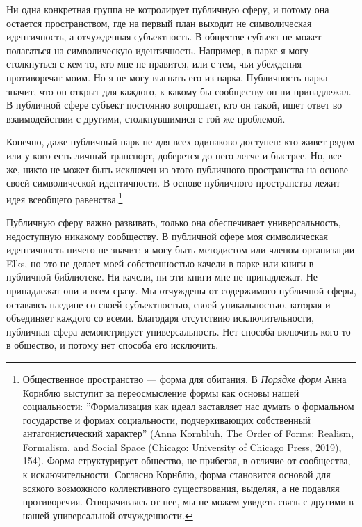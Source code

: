 \documentclass[12pt]{book}
\begin{document}
Ни одна конкретная группа не котролирует публичную сферу, и потому она остается пространством, где на первый план выходит не символическая идентичность, а отчужденная субъектность. В обществе субъект не может полагаться на символическую идентичность. Например, в парке я могу столкнуться с кем-то, кто мне не нравится, или с тем, чьи убеждения противоречат моим. Но я не могу выгнать его из парка. Публичность парка значит, что он открыт для каждого, к какому бы сообществу он ни принадлежал. В публичной сфере субъект постоянно вопрошает, кто он такой, ищет ответ во взаимодействии с другими, столкнувшимися с той же проблемой.

Конечно, даже публичный парк не для всех одинаково доступен: кто живет рядом или у кого есть личный транспорт, доберется до него легче и быстрее. Но, все же, никто не может быть исключен из этого публичного пространства на основе своей символической идентичности. В основе публичного пространства лежит идея всеобщего равенства.\footnote{Общественное пространство --- форма для обитания. В \textit{Порядке форм} Анна Корнблю выступит за переосмысление формы как основы нашей социальности: ''Формализация как идеал заставляет нас думать о формальном государстве и формах социальности, подчеркивающих собственный антагонистический характер'' (Anna Kornbluh, The Order of Forms: Realism, Formalism, and Social Space (Chicago: University of Chicago Press, 2019), 154). Форма структурирует общество, не прибегая, в отличие от сообщества, к исключительности. Согласно Корнблю, форма становится основой для всякого возможного коллективного существования, выделяя, а не подавляя противоречия. Отворачиваясь от нее, мы не можем увидеть связь с другими в нашей универсальной отчужденности.}

Публичную сферу важно развивать, только она обеспечивает универсальность, недоступную никакому сообществу. В публичной сфере моя символическая идентичность ничего не значит: я могу быть методистом или членом организации Elks, но это не делает моей собственностью качели в парке или книги в публичной библиотеке. Ни качели, ни эти книги мне не принадлежат. Не принадлежат они и всем сразу. Мы отчуждены от содержимого публичной сферы, оставаясь наедине со своей субъектностью, своей уникальностью, которая и объединяет каждого со всеми. Благодаря отсутствию исключительности, публичная сфера демонстрирует универсальность. Нет способа включить кого-то в общество, и потому нет способа его исключить.
\end{document}
